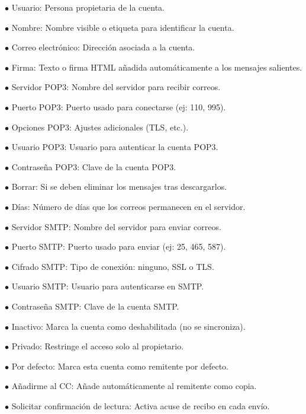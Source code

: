 \documentclass[a4paper]{article}
\begin{document}
\begin{compactitem}
\item[\color{myblue}$\bullet$] Usuario: Persona propietaria de la cuenta.
\item[\color{myblue}$\bullet$] Nombre: Nombre visible o etiqueta para identificar la cuenta.
\item[\color{myblue}$\bullet$] Correo electrónico: Dirección asociada a la cuenta.
\item[\color{myblue}$\bullet$] Firma: Texto o firma HTML añadida automáticamente a los mensajes salientes.
\item[\color{myblue}$\bullet$] Servidor POP3: Nombre del servidor para recibir correos.
\item[\color{myblue}$\bullet$] Puerto POP3: Puerto usado para conectarse (ej: 110, 995).
\item[\color{myblue}$\bullet$] Opciones POP3: Ajustes adicionales (TLS, etc.).
\item[\color{myblue}$\bullet$] Usuario POP3: Usuario para autenticar la cuenta POP3.
\item[\color{myblue}$\bullet$] Contraseña POP3: Clave de la cuenta POP3.
\item[\color{myblue}$\bullet$] Borrar: Si se deben eliminar los mensajes tras descargarlos.
\item[\color{myblue}$\bullet$] Días: Número de días que los correos permanecen en el servidor.
\item[\color{myblue}$\bullet$] Servidor SMTP: Nombre del servidor para enviar correos.
\item[\color{myblue}$\bullet$] Puerto SMTP: Puerto usado para enviar (ej: 25, 465, 587).
\item[\color{myblue}$\bullet$] Cifrado SMTP: Tipo de conexión: ninguno, SSL o TLS.
\item[\color{myblue}$\bullet$] Usuario SMTP: Usuario para autenticarse en SMTP.
\item[\color{myblue}$\bullet$] Contraseña SMTP: Clave de la cuenta SMTP.
\item[\color{myblue}$\bullet$] Inactivo: Marca la cuenta como deshabilitada (no se sincroniza).
\item[\color{myblue}$\bullet$] Privado: Restringe el acceso solo al propietario.
\item[\color{myblue}$\bullet$] Por defecto: Marca esta cuenta como remitente por defecto.
\item[\color{myblue}$\bullet$] Añadirme al CC: Añade automáticamente al remitente como copia.
\item[\color{myblue}$\bullet$] Solicitar confirmación de lectura: Activa acuse de recibo en cada envío.
\end{compactitem}
\end{document}
